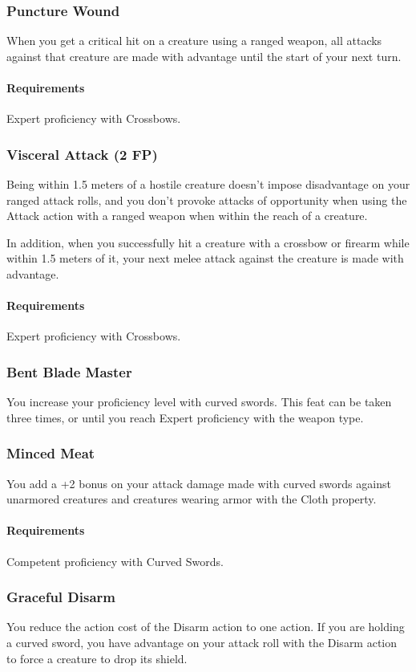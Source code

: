 \subsubsection{Puncture Wound} \label{feat::puncturewound}
    When you get a critical hit on a creature using a ranged weapon, all attacks against that creature are made with advantage until the start of your next turn.
    \paragraph{Requirements} Expert proficiency with Crossbows.
\subsubsection{Visceral Attack (2 FP)} \label{feat::visceralattack}
    Being within 1.5 meters of a hostile creature doesn't impose disadvantage on your ranged attack rolls, and you don't provoke attacks of opportunity when using the Attack action with a ranged weapon when within the reach of a creature.

    In addition, when you successfully hit a creature with a crossbow or firearm while within 1.5 meters of it, your next melee attack against the creature is made with advantage.
    \paragraph{Requirements} Expert proficiency with Crossbows.
\subsubsection{Bent Blade Master} \label{feat::bentblademaster}
    You increase your proficiency level with curved swords.
    This feat can be taken three times, or until you reach Expert proficiency with the weapon type.
\subsubsection{Minced Meat} \label{feat::mincedmeat}
    You add a +2 bonus on your attack damage made with curved swords against unarmored creatures and creatures wearing armor with the Cloth property.
    \paragraph{Requirements} Competent proficiency with Curved Swords.
\subsubsection{Graceful Disarm} \label{feat::gracefuldisarm}
    You reduce the action cost of the Disarm action to one action.
    If you are holding a curved sword, you have advantage on your attack roll with the Disarm action to force a creature to drop its shield.
